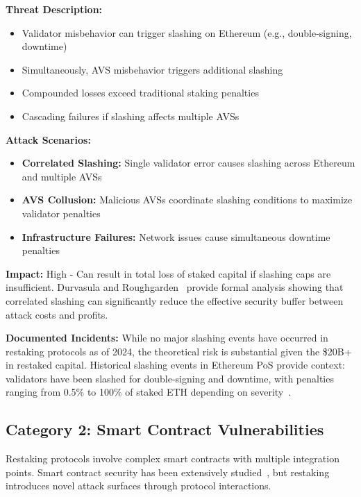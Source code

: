 \documentclass[runningheads]{llncs}
\begin{document}
\textbf{Threat Description:}
\begin{itemize}
    \item Validator misbehavior can trigger slashing on Ethereum (e.g., double-signing, downtime)
    \item Simultaneously, AVS misbehavior triggers additional slashing
    \item Compounded losses exceed traditional staking penalties
    \item Cascading failures if slashing affects multiple AVSs
\end{itemize}

\textbf{Attack Scenarios:}
\begin{itemize}
    \item \textbf{Correlated Slashing:} Single validator error causes slashing across Ethereum and multiple AVSs
    \item \textbf{AVS Collusion:} Malicious AVSs coordinate slashing conditions to maximize validator penalties
    \item \textbf{Infrastructure Failures:} Network issues cause simultaneous downtime penalties
\end{itemize}

\textbf{Impact:} High - Can result in total loss of staked capital if slashing caps are insufficient. Durvasula and Roughgarden~\cite{durvasula2024robust} provide formal analysis showing that correlated slashing can significantly reduce the effective security buffer between attack costs and profits.

\textbf{Documented Incidents:}
While no major slashing events have occurred in restaking protocols as of 2024, the theoretical risk is substantial given the \$20B+ in restaked capital. Historical slashing events in Ethereum PoS provide context: validators have been slashed for double-signing and downtime, with penalties ranging from 0.5\% to 100\% of staked ETH depending on severity~\cite{ethereum2024staking}.

\subsection{Category 2: Smart Contract Vulnerabilities}

Restaking protocols involve complex smart contracts with multiple integration points. Smart contract security has been extensively studied~\cite{atzei2017survey,huang2021survey,chen2020defining,luu2016making}, but restaking introduces novel attack surfaces through protocol interactions.
\end{document}
